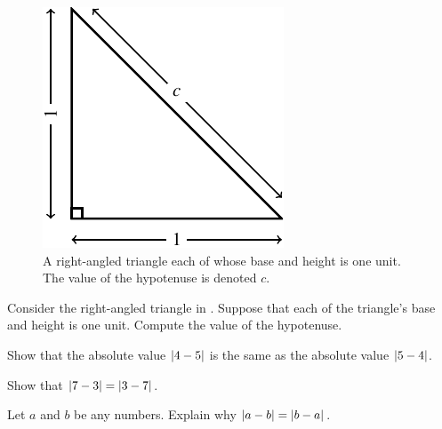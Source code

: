 \documentclass[a4paper,oneside,12pt]{article}
\begin{document}
\begin{figure}[!htbp]
\centering
\includegraphics[scale=1.1]{image/03/triangle.pdf}
\caption{%
  A right-angled triangle each of whose base and height is one unit.
  The value of the hypotenuse is denoted $c$.
}
\label{fig:right_angled_triangle}
\end{figure}

\begin{exercise}
Consider the right-angled triangle in
.  Suppose that each of the
triangle's base and height is one unit.  Compute the value of the
hypotenuse.
\end{exercise}

\begin{exercise}
\begin{packedenum}
\item\label{subex:absolute_value_4_minus_5}
  Show that the absolute value $\lvert4 - 5\rvert$ is the same as
  the absolute value $\lvert5 - 4\rvert$.

\item\label{subex:absolute_value_7_minus_3}
  Show that $\lvert7 - 3\rvert = \lvert3 - 7\rvert$.

\item\label{subex:absolute_value_a_minus_b}
  Let $a$ and $b$ be any numbers.  Explain why
  $\lvert a - b\rvert = \lvert b - a\rvert$.
\end{packedenum}
\end{exercise}
\end{document}
